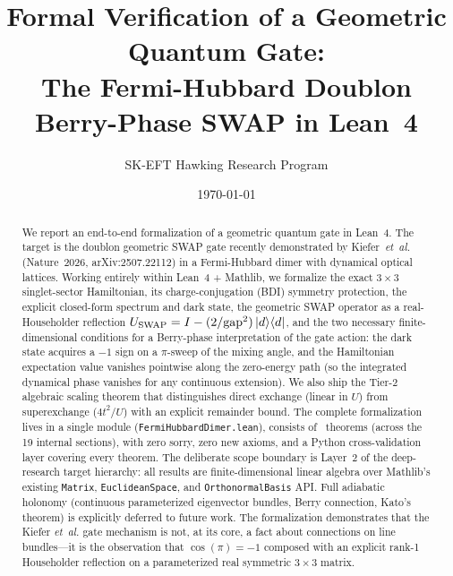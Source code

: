 \documentclass[aps,prd,twocolumn,showpacs,superscriptaddress,nofootinbib]{revtex4-2}
\newcommand{\USWAP}{U_{\rm SWAP}}
\begin{document}
\title{Formal Verification of a Geometric Quantum Gate:\\
The Fermi-Hubbard Doublon Berry-Phase SWAP in Lean~4}

\author{SK-EFT Hawking Research Program}

\date{\today}

\begin{abstract}
We report an end-to-end formalization of a geometric quantum gate in
Lean~4. The target is the doublon geometric
SWAP gate recently demonstrated by Kiefer~\textit{et~al.}
(Nature~2026, arXiv:2507.22112) in a Fermi-Hubbard dimer with dynamical
optical lattices. Working entirely within Lean~4 + Mathlib, we formalize
the exact $3\times 3$ singlet-sector Hamiltonian, its charge-conjugation
(BDI) symmetry protection, the explicit closed-form spectrum and dark
state, the geometric SWAP operator as a real-Householder reflection
$\USWAP = I - (2/\text{gap}^2)\,|d\rangle\langle d|$, and the two
necessary finite-dimensional conditions for a Berry-phase
interpretation of the gate action: the dark state acquires a $-1$
sign on a $\pi$-sweep of the mixing angle, and the Hamiltonian
expectation value vanishes pointwise along the zero-energy path
(so the integrated dynamical phase vanishes for any continuous
extension). We also ship the Tier-2 algebraic scaling theorem that
distinguishes direct exchange (linear in $U$) from superexchange
($4t^2/U$) with an explicit remainder bound. The complete formalization
lives in a single module (\texttt{FermiHubbardDimer.lean}), consists of
\fhdTotal{}~theorems (across the 19 internal sections),
with zero sorry, zero new axioms, and a Python cross-validation layer
covering every theorem. The deliberate
scope boundary is Layer~2 of the deep-research target hierarchy: all
results are finite-dimensional linear algebra over Mathlib's existing
\texttt{Matrix}, \texttt{EuclideanSpace}, and \texttt{OrthonormalBasis}
API. Full adiabatic holonomy (continuous parameterized eigenvector
bundles, Berry connection, Kato's theorem) is explicitly deferred to
future work. The formalization demonstrates that the Kiefer
\textit{et~al.} gate mechanism is not, at its core, a fact about
connections on line bundles---it is the observation that $\cos(\pi) =
-1$ composed with an explicit rank-1 Householder reflection on a
parameterized real symmetric $3\times 3$ matrix.
\end{abstract}

\maketitle
\end{document}
